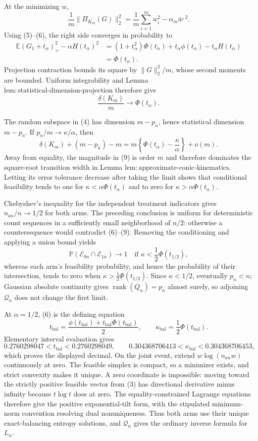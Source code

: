 At the minimizing \(w\),
\[
 \frac1m\|\Pi_{K_m}(G)\|_2^2
 =\frac1m\sum_{i=1}^mw_i^2-\alpha_m\bar w^{,2}.
\]
Using (5)--(6), the right side converges in probability to
\[
 \begin{aligned}
 \mathbb E(G_1+t_\alpha)_+^2-\alpha H(t_\alpha)^2
 &=(1+t_\alpha^2)\Phi(t_\alpha)+t_\alpha\phi(t_\alpha)
   -t_\alpha H(t_\alpha)\\
 &=\Phi(t_\alpha).
 \end{aligned}
 \tag{7}
\]
Projection contraction bounds its square by \(\|G\|_2^2/m\), whose second moments are bounded.  Uniform integrability and Lemma \(\mathrm{lem{:}statistical\mbox{-}dimension\mbox{-}projection}\) therefore give
\[
 \frac{\delta(K_m)}m\longrightarrow\Phi(t_\alpha).
 \tag{8}
\]

The random subspace in (4) has dimension \(m-p_n\), hence statistical dimension \(m-p_n\).  If \(p_n/m\to\kappa/\alpha\), then
\[
 \delta(K_m)+(m-p_n)-m
 =m\left\{\Phi(t_\alpha)-\frac\kappa\alpha\right\}+o(m).
 \tag{9}
\]
Away from equality, the magnitude in (9) is order \(m\) and therefore dominates the square-root transition width in Lemma \(\mathrm{lem{:}approximate\mbox{-}conic\mbox{-}kinematics}\).  Letting its error tolerance decrease after taking the limit shows that conditional feasibility tends to one for \(\kappa<\alpha\Phi(t_\alpha)\) and to zero for \(\kappa>\alpha\Phi(t_\alpha)\).

Chebyshev's inequality for the independent treatment indicators gives \(n_{an}/n\to1/2\) for both arms.  The preceding conclusion is uniform for deterministic count sequences in a sufficiently small neighborhood of \(n/2\): otherwise a countersequence would contradict (6)--(9).  Removing the conditioning and applying a union bound yields
\[
 \mathbb P(\mathcal E_{0n}\cap\mathcal E_{1n})\to1
 \quad\text{if }\kappa<\frac12\Phi(t_{1/2}),
\]
whereas each arm's feasibility probability, and hence the probability of their intersection, tends to zero when \(\kappa>\frac12\Phi(t_{1/2})\).  Since \(\kappa<1/2\), eventually \(p_n<n\); Gaussian absolute continuity gives \(\operatorname{rank}(Q_n)=p_n\) almost surely, so adjoining \(\mathcal Q_n\) does not change the first limit.

At \(\alpha=1/2\), (6) is the defining equation
\[
 t_{\mathrm{bal}}
 =\frac{\phi(t_{\mathrm{bal}})+t_{\mathrm{bal}}\Phi(t_{\mathrm{bal}})}2,
 \qquad
 \kappa_{\mathrm{bal}}=\frac12\Phi(t_{\mathrm{bal}}).
\]
Elementary interval evaluation gives
\[
 0.2760298047<t_{\mathrm{bal}}<0.2760298049,
 \qquad
 0.304368706413<\kappa_{\mathrm{bal}}<0.304368706453,
\]
which proves the displayed decimal.  On the joint event, extend \(w\log(n_{an}w)\) continuously at zero.  The feasible simplex is compact, so a minimizer exists, and strict convexity makes it unique.  A zero coordinate is impossible: moving toward the strictly positive feasible vector from (3) has directional derivative minus infinity because \(t\log t\) does at zero.  The equality-constrained Lagrange equations therefore give the positive exponential-tilt form, with the stipulated minimum-norm convention resolving dual nonuniqueness.  Thus both arms use their unique exact-balancing entropy solutions, and \(\mathcal Q_n\) gives the ordinary inverse formula for \(L_n\).

